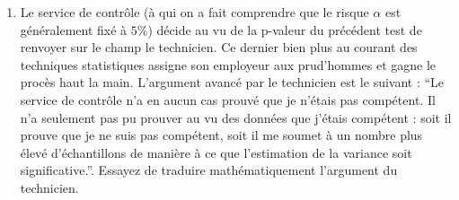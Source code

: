 \documentclass[10pt]{report}
\begin{document}
\begin{exercice}
\begin{enumerate}
\begin{Correction}
\noindent \textbf{Hypothèses de test} : $\mathbf{H}_0:$ $\sigma^2_{C}=0.1$ vs {\large $\mathbf{H}_1:$ $\sigma^2_{C}<0.1$}\\
\textbf{Statistique de test sous $\mathbf{H}_0$} :
  $$
  \Est{\delta_{\sigma^2_{C},0.1}}{Y^{C}}= {\displaystyle \frac{\Est{\sigma^2_{C}}{Y^{C}}-0.1}{
\Est{\sigma_{\cqlshat{\sigma^2_{C}}}}{Y^{C}}
}} 
  \SuitApprox \mathcal{N}(0,1)
  $$
\textbf{Règle de décision} : Accepter $\mathbf{H}_1$ si 
  p-valeur (gauche) < 5\%\\
\noindent \textbf{Conclusion} :
puisqu'au vu des données, 
  \[
p-valeur\NotR\mathtt{pnorm((var(yC)-0.1)/seVar(yC))} \simeq 29.2\%\nless5\%,
\]
on ne peut pas plutôt penser (avec un risque de 5\%) que le technicien est compétent.

\textbf{\underline{Option correction SANS p-valeur~:}}\\

\noindent \textbf{Hypothèses de test} : $\mathbf{H}_0:$ $\sigma^2_{C}=0.1$ vs {\large $\mathbf{H}_1:$ $\sigma^2_{C}<0.1$}\\
\textbf{Statistique de test sous $\mathbf{H}_0$} :
  $$
  \Est{\delta_{\sigma^2_{C},0.1}}{Y^{C}}= {\displaystyle \frac{\Est{\sigma^2_{C}}{Y^{C}}-0.1}{
\Est{\sigma_{\cqlshat{\sigma^2_{C}}}}{Y^{C}}
}} 
  \SuitApprox \mathcal{N}(0,1)
  $$
\textbf{Règle de décision} : Accepter $\mathbf{H}_1$ si 
  $\Est{\delta_{\sigma^2_{C},0.1}}{y^{C}} < \delta^-_{lim,5\%}$\\
\noindent \textbf{Conclusion} :
puisqu'au vu des données, 
  \begin{eqnarray*}
\Est{\delta_{\sigma^2_{C},0.1}}{y^{C}} &\NotR&\mathtt{(var(yC)-0.1)/seVar(yC)}\simeq -0.5474076\\&\nless & \delta^-_{lim,5\%} \NotR \mathtt{-qnorm(1-.05)}\simeq-1.644854
\end{eqnarray*}
  
on ne peut pas plutôt penser (avec un risque de 5\%) que le technicien est compétent.
\end{Correction}


\item Le service de contr{\^o}le ({\`a} qui on a fait comprendre que le risque $\alpha$ est g{\'e}n{\'e}ralement fix{\'e} {\`a} $5\%$) d{\'e}cide au vu de la p-valeur du pr{\'e}c{\'e}dent test de renvoyer sur le champ le technicien. Ce dernier bien plus au courant des techniques statistiques assigne son employeur aux prud'hommes et gagne le proc{\`e}s haut la main. L'argument avanc{\'e} par le technicien est le suivant : ``Le service de contr{\^o}le n'a en aucun cas prouv{\'e} que je n'{\'e}tais pas comp{\'e}tent. Il n'a seulement pas pu prouver au vu des donn{\'e}es que j'{\'e}tais comp{\'e}tent : soit il prouve que je ne suis pas comp{\'e}tent, soit il me soumet {\`a} un nombre plus {\'e}lev{\'e} d'{\'e}chantillons de mani{\`e}re {\`a} ce que l'estimation de la variance soit significative.''. Essayez de traduire math{\'e}matiquement l'argument du technicien. 



\end{enumerate}
\end{exercice}
\end{document}

